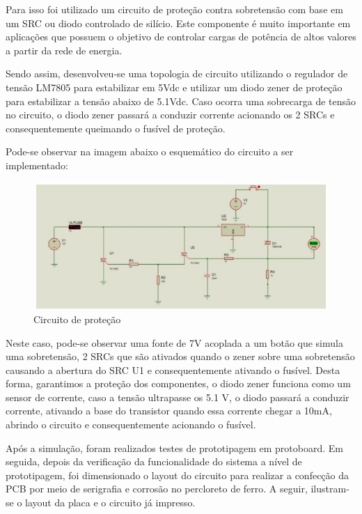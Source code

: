 Para isso foi utilizado um circuito de proteção contra sobretensão com base em um SRC ou diodo controlado de silício. Este componente é muito importante em aplicações que possuem o objetivo de controlar cargas de potência de altos valores a partir da rede de energia.

Sendo assim, desenvolveu-se uma topologia de circuito utilizando o regulador de tensão LM7805 para estabilizar em 5Vdc e utilizar um diodo zener de proteção para estabilizar a tensão abaixo de 5.1Vdc. Caso ocorra uma sobrecarga de tensão no circuito, o diodo zener passará a conduzir corrente acionando os 2 SRCs e consequentemente queimando o fusível de proteção.

Pode-se observar na imagem abaixo o esquemático do circuito a ser implementado:

	\begin{figure}[H]
		\begin{center}
		\includegraphics[scale = 1]{figuras/Circuito_Protecao}
		\caption{Circuito de proteção}
		\end{center}
	\end{figure}
Neste caso, pode-se observar uma fonte de 7V acoplada a um botão que simula uma sobretensão, 2 SRCs que são ativados quando o zener sobre uma sobretensão  causando a abertura do SRC U1 e consequentemente ativando o fusível. Desta forma,  garantimos  a proteção dos componentes, o diodo zener funciona como um sensor de corrente, caso a tensão ultrapasse os 5.1 V, o diodo passará a conduzir corrente, ativando a base do transistor quando essa corrente chegar a 10mA, abrindo o circuito e consequentemente acionando o fusível.

Após a simulação, foram realizados testes de prototipagem em protoboard. Em seguida, depois da verificação da funcionalidade do sistema a nível de prototipagem, foi dimensionado o layout do circuito para realizar a confecção da PCB por meio de serigrafia e corrosão no percloreto de ferro. A seguir, ilustram-se o layout da placa e o circuito já impresso.


